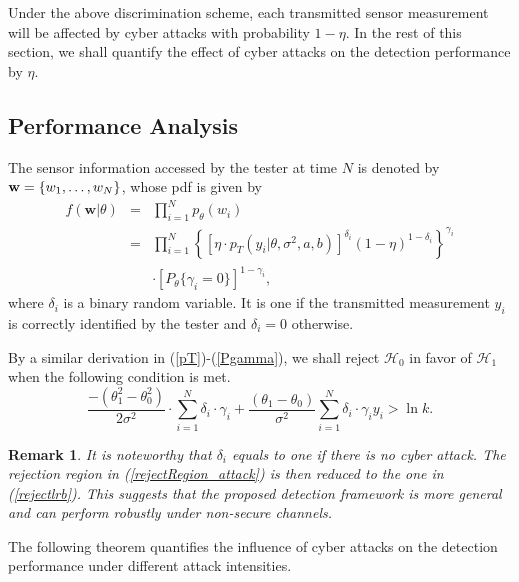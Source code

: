 \documentclass[journal]{IEEEtran}
\def\cH{\mathcal{H}}
\def\beq{\begin{eqnarray}}
\def\enq{\end{eqnarray}}
\newtheorem{rem}{Remark}
\begin{document}
Under the above discrimination scheme,  each transmitted sensor measurement will be affected by cyber attacks with probability $1-\eta$.  In the rest of this section, we shall quantify the effect of cyber attacks on the detection performance by $\eta$.

\subsection{Performance Analysis}
The sensor information accessed by the tester at time $N$ is denoted by ${\bf{w}} = \{ {w_1}, \ldots ,{w_N}\}$, whose pdf is given by
\beq
\label{pdf_attack}
f(\textbf{w}|\theta)&=&\prod\limits_{i = 1}^N {{p_\theta }({w_i})} \nonumber\\
& =  &\prod\limits_{i = 1}^N {{{\left\{ {{{\left[ {\eta  \cdot {p_T}({y_i}|\theta ,{\sigma ^2},a,b)} \right]}^{\delta_i} }{{(1 - \eta )}^{1 - \delta_i}}} \right\}}^{{\gamma _i}}}} \nonumber\\
& & \cdot {\left[ {{P_\theta }\{ {\gamma _i} = 0\} } \right]^{1 - {\gamma _i}}},\quad
\enq
where $\delta_i$ is a binary random variable. It is one if the transmitted measurement $y_i$ is correctly identified by the tester and $\delta_i=0$ otherwise.





By a similar derivation in (\ref{pT})-(\ref{Pgamma}), we shall reject $\cH_{0}$ in favor of $\cH_{1}$ when the following condition is met.
\begin{equation}
\label{rejectRegion_attack}
\frac{{ - (\theta _1^2 - \theta _0^2)}}{{2{\sigma ^2}}} \cdot \sum\limits_{i = 1}^N {{\delta _i} \cdot {\gamma _i}}  + \frac{{({\theta _1} - {\theta _0})}}{{{\sigma ^2}}}\sum\limits_{i = 1}^N {{\delta _i} \cdot {\gamma _i}{y_i}}  > \ln k.
\end{equation}


\begin{rem}
It is noteworthy that $\delta_i$ equals to one if there is no cyber attack. The rejection region in (\ref{rejectRegion_attack}) is then reduced to the one in (\ref{rejectlrb}). This suggests that  the proposed detection framework is more general and can perform robustly under non-secure channels.
\end{rem}

The following theorem quantifies the influence of cyber attacks on the detection performance under different attack intensities.
\end{document}
